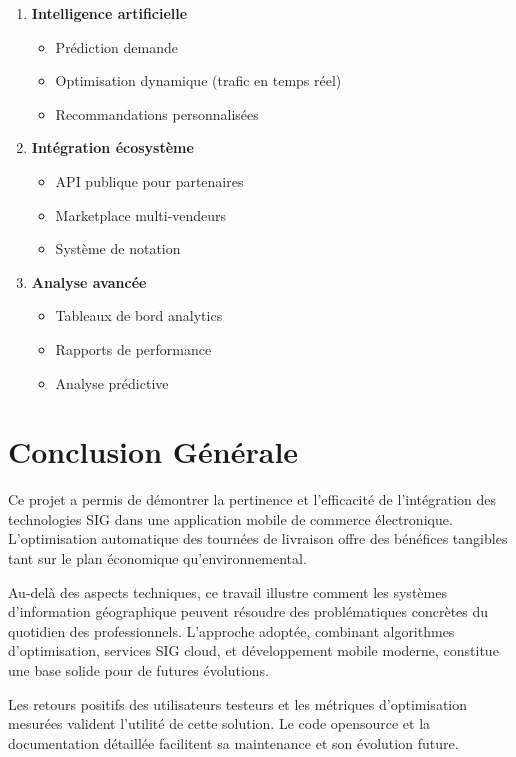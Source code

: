 \documentclass[12pt,a4paper]{report}
\begin{document}
\begin{enumerate}
    \item \textbf{Intelligence artificielle}
    \begin{itemize}
        \item Prédiction demande
        \item Optimisation dynamique (trafic en temps réel)
        \item Recommandations personnalisées
    \end{itemize}

    \item \textbf{Intégration écosystème}
    \begin{itemize}
        \item API publique pour partenaires
        \item Marketplace multi-vendeurs
        \item Système de notation
    \end{itemize}

    \item \textbf{Analyse avancée}
    \begin{itemize}
        \item Tableaux de bord analytics
        \item Rapports de performance
        \item Analyse prédictive
    \end{itemize}
\end{enumerate}

\section{Conclusion Générale}

Ce projet a permis de démontrer la pertinence et l'efficacité de l'intégration des technologies SIG dans une application mobile de commerce électronique. L'optimisation automatique des tournées de livraison offre des bénéfices tangibles tant sur le plan économique qu'environnemental.

Au-delà des aspects techniques, ce travail illustre comment les systèmes d'information géographique peuvent résoudre des problématiques concrètes du quotidien des professionnels. L'approche adoptée, combinant algorithmes d'optimisation, services SIG cloud, et développement mobile moderne, constitue une base solide pour de futures évolutions.

Les retours positifs des utilisateurs testeurs et les métriques d'optimisation mesurées valident l'utilité de cette solution. Le code opensource et la documentation détaillée facilitent sa maintenance et son évolution future.
\end{document}

